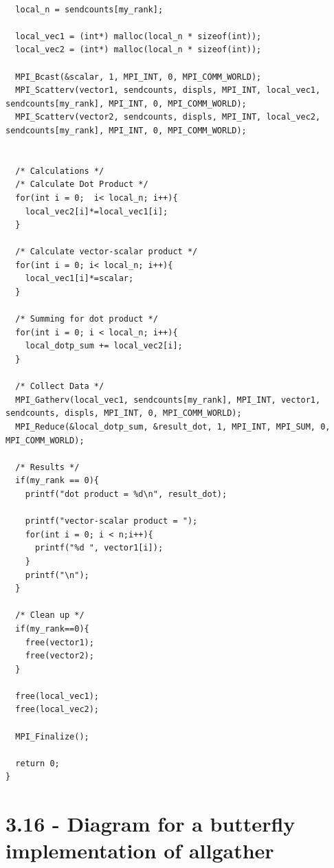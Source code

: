 \documentclass[a4paper,11pt,twoside]{article}
\begin{document}
\begin{verbatim}
 
  local_n = sendcounts[my_rank];

  local_vec1 = (int*) malloc(local_n * sizeof(int));
  local_vec2 = (int*) malloc(local_n * sizeof(int));
  
  MPI_Bcast(&scalar, 1, MPI_INT, 0, MPI_COMM_WORLD);
  MPI_Scatterv(vector1, sendcounts, displs, MPI_INT, local_vec1, sendcounts[my_rank], MPI_INT, 0, MPI_COMM_WORLD);
  MPI_Scatterv(vector2, sendcounts, displs, MPI_INT, local_vec2, sendcounts[my_rank], MPI_INT, 0, MPI_COMM_WORLD);

  
  /* Calculations */
  /* Calculate Dot Product */
  for(int i = 0;  i< local_n; i++){
    local_vec2[i]*=local_vec1[i];
  }

  /* Calculate vector-scalar product */
  for(int i = 0; i< local_n; i++){
    local_vec1[i]*=scalar;
  }

  /* Summing for dot product */
  for(int i = 0; i < local_n; i++){
    local_dotp_sum += local_vec2[i];    
  } 
 
  /* Collect Data */
  MPI_Gatherv(local_vec1, sendcounts[my_rank], MPI_INT, vector1, sendcounts, displs, MPI_INT, 0, MPI_COMM_WORLD); 
  MPI_Reduce(&local_dotp_sum, &result_dot, 1, MPI_INT, MPI_SUM, 0, MPI_COMM_WORLD);

  /* Results */
  if(my_rank == 0){
    printf("dot product = %d\n", result_dot);

    printf("vector-scalar product = ");
    for(int i = 0; i < n;i++){
      printf("%d ", vector1[i]);
    }
    printf("\n");
  }

  /* Clean up */
  if(my_rank==0){
    free(vector1);
    free(vector2);
  }
  
  free(local_vec1);
  free(local_vec2);

  MPI_Finalize();

  return 0;
} 

\end{verbatim}



\section{3.16 - Diagram for a butterfly implementation of allgather}
\end{document}
